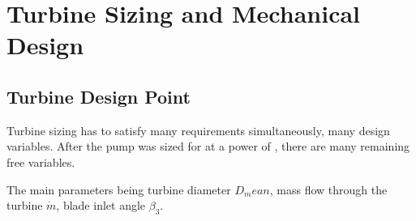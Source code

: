 \section{Turbine Sizing and Mechanical Design}


\subsection{Turbine Design Point}

Turbine sizing has to satisfy many requirements simultaneously, many design variables. After the pump was sized for \valPumpRpmDesign at a power of \valTurbPowerDesign, there are many remaining free variables.

The main parameters being turbine diameter $D_mean$, mass flow through the turbine $\dot{m}$, blade inlet angle $\beta_3$.

